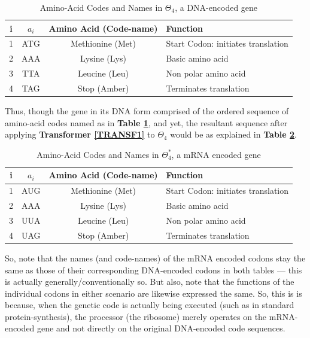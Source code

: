 \documentclass[a4paper, 18pt]{article} %
\begin{document}
\begin{table}[h]
  \centering
  \Large
	\begin{tabular}[t]{|c|c|c|p{3cm}|}
	\hline
	i & $a_i$ & \textbf{Amino Acid (Code-name)} & \textbf{Function}\\
	\hline
	\hline
	1 & ATG & Methionine (Met) & Start Codon: initiates translation\\
	\hline
	2 & AAA & Lysine (Lys) & Basic amino acid\\
	\hline
	3 & TTA & Leucine (Leu) & Non polar amino acid\\
	\hline
	4 & TAG & Stop (Amber) & Terminates translation\\
	
	\hline
	              
\end{tabular}
 \caption{Amino-Acid Codes and Names in $\Theta_4$, a DNA-encoded gene}
  \label{TAB1}
\end{table}

Thus, though the gene in its DNA form comprised of the ordered sequence of amino-acid codes named as in \textbf{Table \ref{TAB1}}, and yet, the resultant sequence after applying \textbf{Transformer \ref{TRANSF1}} to $\Theta_4$ would be as explained in \textbf{Table \ref{TAB2}}.


\begin{table}[h]
  \centering
  \Large
	\begin{tabular}[t]{|c|c|c|p{3cm}|}
	\hline
	i & $a_i$ & \textbf{Amino Acid (Code-name)} & \textbf{Function}\\
	\hline
	\hline
	1 & AUG & Methionine (Met) & Start Codon: initiates translation\\
	\hline
	2 & AAA & Lysine (Lys) & Basic amino acid\\
	\hline
	3 & UUA & Leucine (Leu) & Non polar amino acid\\
	\hline
	4 & UAG & Stop (Amber) & Terminates translation\\
	
	\hline
	              
\end{tabular}
 \caption{Amino-Acid Codes and Names in $\Theta_4^*$, a mRNA encoded gene}
  \label{TAB2}
\end{table}

So, note that the names (and code-names) of the mRNA encoded codons stay the same as those of their corresponding DNA-encoded codons in both tables --- this is actually generally/conventionally so. But also, note that the functions of the individual codons in either scenario are likewise expressed the same. So, this is is because, when the genetic code is actually being executed (such as in standard protein-synthesis), the processor (the ribosome) merely operates on the mRNA-encoded gene and not directly on the original DNA-encoded code sequences.
\end{document}
